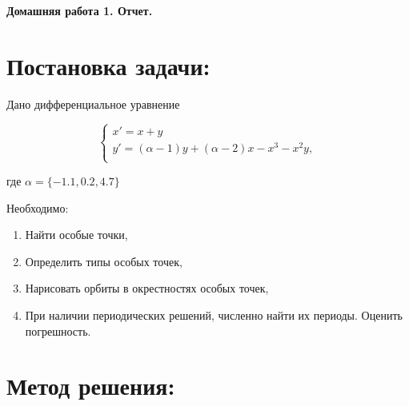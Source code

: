 \documentclass[12pt,a4paper]{article}
\begin{document}
\newcommand{\parw}[2]{\dfrac{\partial #1}{\partial #2}}
\newcommand{\pl}{p_{\lambda}}
\newcommand{\pa}{p_{a}}
\newcommand{\pgm}{p_{m, \sigma^2}}
\newcommand{\pma}{p_{M, a}}
\newcommand{\xseqn}{x_1, \ldots, x_n}
\renewcommand{\le}{\leqslant}


\newcommand*{\hm}[1]{#1\nobreak\discretionary{}%
{\hbox{$\mathsurround=0pt #1$}}{}}

\begin{center}
\textbf{Домашняя работа 1. Отчет.}
\end{center}

\section{Постановка задачи:}

Дано дифференциальное уравнение

$$
\left\{
\begin{array}{lcl}
x' = x + y\\
y' = (\alpha - 1) y + (\alpha - 2) x - x^3 - x^2 y,\\
\end{array}
\right.
$$

где
$
\alpha = \{-1.1, 0.2, 4.7\}
$

Необходимо:
\begin{enumerate}
\item Найти особые точки,
\item Определить типы особых точек,
\item Нарисовать орбиты в окрестностях особых точек,
\item При наличии периодических решений, численно найти их периоды. Оценить погрешность.
\end{enumerate}

\bigskip

\section{Метод решения:}
\end{document}
